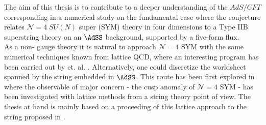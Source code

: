 The aim of this thesis is to contribute to a deeper understanding of the $AdS/CFT$ corresponding in a numerical study on the fundamental case where the conjecture relates $\mathcal{N}=4\; SU(N)$ super  (SYM) theory in four dimensions to a Type IIB superstring theory on an $\AdSS$ background, supported by a  five-form flux.\\
As a non- gauge theory it is natural to approach $\mathcal{N}=4$ SYM with the same numerical techniques known from lattice QCD, where an interesting program has been carried out by  et. al. \cite{Catterall_physrept, Bergner:2016sbv}. Alternatively, one could discretize the worldsheet spanned by the  string embedded in $\AdSS$. This route has been first explored in \cite{Roiban} where the observable of major concern - the cusp anomaly of $\mathcal{N}=4$ SYM - has been investigated with lattice methods from a string theory point of view. The thesis at hand is mainly based on a proceeding of this lattice approach to the  string  proposed in \cite{Bianchi:2016cyv,Forini:2016sot}.